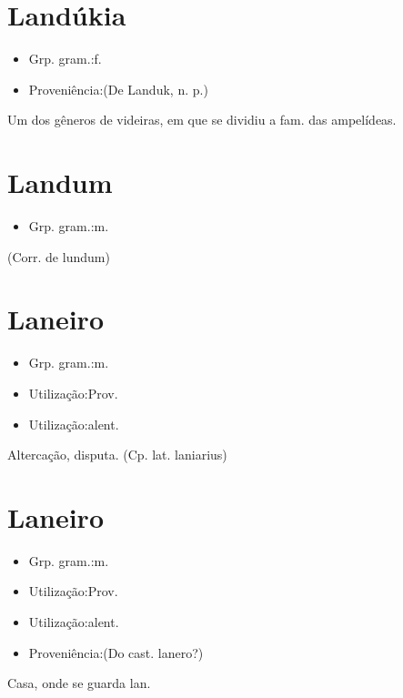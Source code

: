 \section{Landúkia}
\begin{itemize}
\item {Grp. gram.:f.}
\end{itemize}
\begin{itemize}
\item {Proveniência:(De \textunderscore Landuk\textunderscore , n. p.)}
\end{itemize}
Um dos gêneros de videiras, em que se dividiu a fam. das ampelídeas.
\section{Landum}
\begin{itemize}
\item {Grp. gram.:m.}
\end{itemize}
(Corr. de \textunderscore lundum\textunderscore )
\section{Laneiro}
\begin{itemize}
\item {Grp. gram.:m.}
\end{itemize}
\begin{itemize}
\item {Utilização:Prov.}
\end{itemize}
\begin{itemize}
\item {Utilização:alent.}
\end{itemize}
Altercação, disputa.
(Cp. lat. \textunderscore laniarius\textunderscore )
\section{Laneiro}
\begin{itemize}
\item {Grp. gram.:m.}
\end{itemize}
\begin{itemize}
\item {Utilização:Prov.}
\end{itemize}
\begin{itemize}
\item {Utilização:alent.}
\end{itemize}
\begin{itemize}
\item {Proveniência:(Do cast. \textunderscore lanero\textunderscore ?)}
\end{itemize}
Casa, onde se guarda lan.
